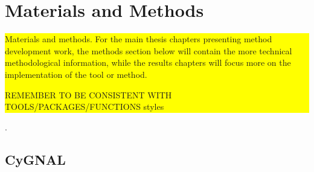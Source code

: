 \chapter{Materials and Methods}
\label{02methods}

\colorbox{yellow}{Materials and methods. For the main thesis chapters presenting method development work, the methods section below will contain the more technical methodological information, while the results chapters will focus more on the implementation of the tool or method.

REMEMBER TO BE CONSISTENT WITH TOOLS/PACKAGES/FUNCTIONS styles}.

\newpage

\section{CyGNAL}

